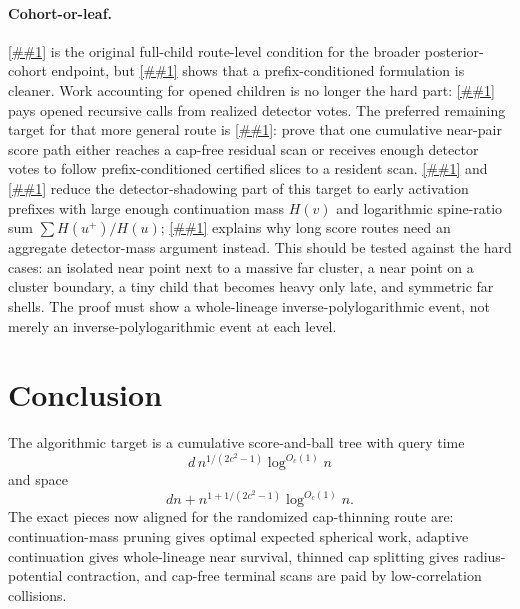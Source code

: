 \documentclass[10pt]{article}
\newcommand{\cref}[1]{\ref{##1}}
\newcommand{\Cref}[1]{\ref{##1}}
\theoremstyle{definition}
\begin{document}
\paragraph{Cohort-or-leaf.}
\Cref{asm:cohort-or-leaf} is the original full-child route-level condition for the broader posterior-cohort endpoint, but \cref{lem:prefix-slice-accounting} shows that a prefix-conditioned formulation is cleaner. Work accounting for opened children is no longer the hard part: \cref{lem:vote-budget} pays opened recursive calls from realized detector votes. The preferred remaining target for that more general route is \cref{asm:prefix-slice-survival}: prove that one cumulative near-pair score path either reaches a cap-free residual scan or receives enough detector votes to follow prefix-conditioned certified slices to a resident scan. \Cref{lem:detector-inflation} and \cref{lem:off-spine-inflation} reduce the detector-shadowing part of this target to early activation prefixes with large enough continuation mass $H(v)$ and logarithmic spine-ratio sum $\sum H(u^+)/H(u)$; \cref{rem:linear-spine-ratio} explains why long score routes need an aggregate detector-mass argument instead. This should be tested against the hard cases: an isolated near point next to a massive far cluster, a near point on a cluster boundary, a tiny child that becomes heavy only late, and symmetric far shells. The proof must show a whole-lineage inverse-polylogarithmic event, not merely an inverse-polylogarithmic event at each level.

\section{Conclusion}

The algorithmic target is a cumulative score-and-ball tree with query time
\[
   d\,n^{1/(2c^2-1)}\log^{O_c(1)}n
\]
and space
\[
   dn+n^{1+1/(2c^2-1)}\log^{O_c(1)}n.
\]
The exact pieces now aligned for the randomized cap-thinning route are: continuation-mass pruning gives optimal expected spherical work, adaptive continuation gives whole-lineage near survival, thinned cap splitting gives radius-potential contraction, and cap-free terminal scans are paid by low-correlation collisions.
\end{document}
